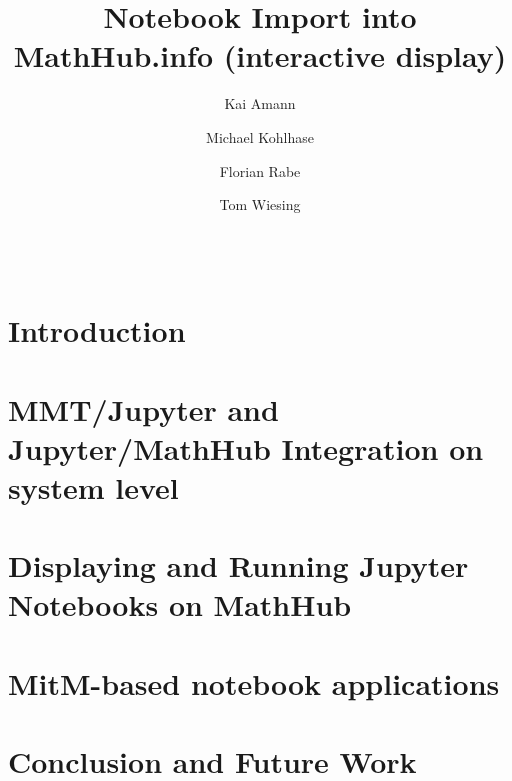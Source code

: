 \documentclass[book]{deliverablereport}
\title{Notebook Import into MathHub.info (interactive display)}
\author{Kai Amann}
\author{Michael Kohlhase}
\author{Florian Rabe}
\author{Tom Wiesing}
\begin{document}
\begin{abstract}\strut\\\end{abstract}
\maketitle
\setcounter{tocdepth}{2}
\newpage\tableofcontents\newpage

\section{Introduction}\label{sec:intro}

\section{MMT/Jupyter and Jupyter/MathHub Integration on system level}\label{sec:mmt-jp}

\section{Displaying and Running Jupyter Notebooks on MathHub}\label{sec:nb-mh}

\section{MitM-based notebook applications}\label{sec:mitm-nb}

\section{Conclusion and Future Work}\label{sec:concl}


\printbibliography
\end{document}
